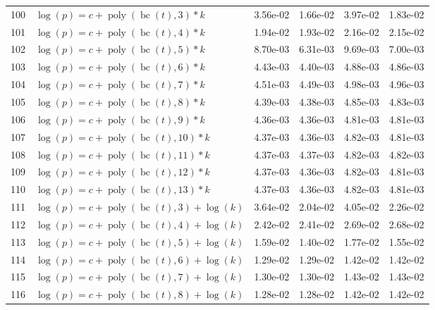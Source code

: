 \documentclass[12pt,a4paper]{article}
\DeclareMathOperator{\bc}{bc}
\DeclareMathOperator{\poly}{poly}
\begin{document}
\begin{longtable}[t]{ll>{\raggedleft\arraybackslash}p{2cm}>{\raggedleft\arraybackslash}p{2cm}>{\raggedleft\arraybackslash}p{2cm}>{\raggedleft\arraybackslash}p{2cm}}
100 & $\log(p) = c + \poly\left( \bc(t), 3 \right) * k$ & 3.56e-02 & 1.66e-02 & 3.97e-02 & 1.83e-02\\
\rowcolor{gray!6}  101 & $\log(p) = c + \poly\left( \bc(t), 4 \right) * k$ & 1.94e-02 & 1.93e-02 & 2.16e-02 & 2.15e-02\\
102 & $\log(p) = c + \poly\left( \bc(t), 5 \right) * k$ & 8.70e-03 & 6.31e-03 & 9.69e-03 & 7.00e-03\\
\rowcolor{gray!6}  103 & $\log(p) = c + \poly\left( \bc(t), 6 \right) * k$ & 4.43e-03 & 4.40e-03 & 4.88e-03 & 4.86e-03\\
104 & $\log(p) = c + \poly\left( \bc(t), 7 \right) * k$ & 4.51e-03 & 4.49e-03 & 4.98e-03 & 4.96e-03\\
\rowcolor{gray!6}  105 & $\log(p) = c + \poly\left( \bc(t), 8 \right) * k$ & 4.39e-03 & 4.38e-03 & 4.85e-03 & 4.83e-03\\
106 & $\log(p) = c + \poly\left( \bc(t), 9 \right) * k$ & 4.36e-03 & 4.36e-03 & 4.81e-03 & 4.81e-03\\
\rowcolor{gray!6}  107 & $\log(p) = c + \poly\left( \bc(t), 10 \right) * k$ & 4.37e-03 & 4.36e-03 & 4.82e-03 & 4.81e-03\\
108 & $\log(p) = c + \poly\left( \bc(t), 11 \right) * k$ & 4.37e-03 & 4.37e-03 & 4.82e-03 & 4.82e-03\\
\rowcolor{gray!6}  109 & $\log(p) = c + \poly\left( \bc(t), 12 \right) * k$ & 4.37e-03 & 4.36e-03 & 4.82e-03 & 4.81e-03\\
110 & $\log(p) = c + \poly\left( \bc(t), 13 \right) * k$ & 4.37e-03 & 4.36e-03 & 4.82e-03 & 4.81e-03\\
\rowcolor{gray!6}  111 & $\log(p) = c + \poly\left( \bc(t), 3 \right) + \log(k)$ & 3.64e-02 & 2.04e-02 & 4.05e-02 & 2.26e-02\\
112 & $\log(p) = c + \poly\left( \bc(t), 4 \right) + \log(k)$ & 2.42e-02 & 2.41e-02 & 2.69e-02 & 2.68e-02\\
\rowcolor{gray!6}  113 & $\log(p) = c + \poly\left( \bc(t), 5 \right) + \log(k)$ & 1.59e-02 & 1.40e-02 & 1.77e-02 & 1.55e-02\\
114 & $\log(p) = c + \poly\left( \bc(t), 6 \right) + \log(k)$ & 1.29e-02 & 1.29e-02 & 1.42e-02 & 1.42e-02\\
\rowcolor{gray!6}  115 & $\log(p) = c + \poly\left( \bc(t), 7 \right) + \log(k)$ & 1.30e-02 & 1.30e-02 & 1.43e-02 & 1.43e-02\\
116 & $\log(p) = c + \poly\left( \bc(t), 8 \right) + \log(k)$ & 1.28e-02 & 1.28e-02 & 1.42e-02 & 1.42e-02\\

\end{longtable}
\end{document}
